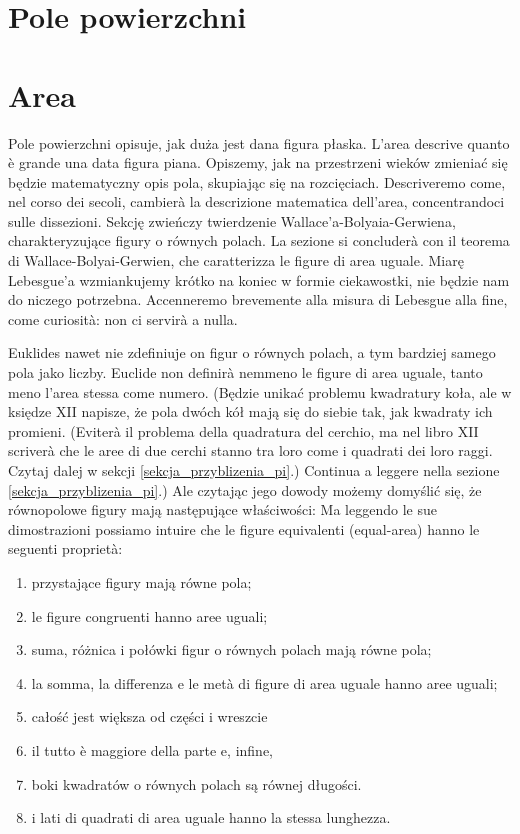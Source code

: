 
\section{Pole powierzchni} %
\section{Area} %
\label{sekcja_pole_powierzchni}

Pole powierzchni opisuje, jak duża jest dana figura płaska. %
L'area descrive quanto è grande una data figura piana. %
Opiszemy, jak na przestrzeni wieków zmieniać się będzie matematyczny opis pola, skupiając się na rozcięciach. %
Descriveremo come, nel corso dei secoli, cambierà la descrizione matematica dell'area, concentrandoci sulle dissezioni. %
Sekcję zwieńczy twierdzenie Wallace'a-Bolyaia-Gerwiena, charakteryzujące figury o równych polach. %
La sezione si concluderà con il teorema di Wallace-Bolyai-Gerwien, che caratterizza le figure di area uguale. %
Miarę Lebesgue'a wzmiankujemy krótko na koniec w formie ciekawostki, nie będzie nam do niczego potrzebna. %
Accenneremo brevemente alla misura di Lebesgue alla fine, come curiosità: non ci servirà a nulla. %

Euklides nawet nie zdefiniuje on figur o równych polach, a tym bardziej samego pola jako liczby. %
Euclide non definirà nemmeno le figure di area uguale, tanto meno l'area stessa come numero. %
(Będzie unikać problemu kwadratury koła, ale w księdze XII napisze, że pola dwóch kół mają się do siebie tak, jak kwadraty ich promieni. %
(Eviterà il problema della quadratura del cerchio, ma nel libro XII scriverà che le aree di due cerchi stanno tra loro come i quadrati dei loro raggi. %
Czytaj dalej w sekcji \ref{sekcja_przyblizenia_pi}.) %
Continua a leggere nella sezione \ref{sekcja_przyblizenia_pi}.) %
Ale czytając jego dowody możemy domyślić się, że równopolowe figury mają następujące właściwości: %
Ma leggendo le sue dimostrazioni possiamo intuire che le figure equivalenti (equal-area) hanno le seguenti proprietà: %
\begin{enumerate}
\item przystające figury mają równe pola; %
\item le figure congruenti hanno aree uguali; %
\item suma, różnica i połówki figur o równych polach mają równe pola; %
\item la somma, la differenza e le metà di figure di area uguale hanno aree uguali; %
\item całość jest większa od części i wreszcie %
\item il tutto è maggiore della parte e, infine, %
\item boki kwadratów o równych polach są równej długości. %
\item i lati di quadrati di area uguale hanno la stessa lunghezza. %
\end{enumerate}

